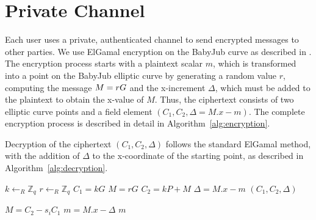 \documentclass[runningheads]{llncs}
\begin{document}
\section{Private Channel}
\label{private-channel}
Each user uses a private, authenticated channel to send encrypted messages to other parties. We use ElGamal encryption on the BabyJub curve as described in \cite{ElGamalEncryptionDecryption2020,jieWeijiekohElgamalbabyjub2023}. The encryption process starts with a plaintext scalar $m$, which is transformed into a point on the BabyJub elliptic curve by generating a random value $r$, computing the message $M=rG$ and the x-increment $\Delta$, which must be added to the plaintext to obtain the x-value of $M$. Thus, the ciphertext consists of two elliptic curve points and a field element $(C_1, C_2, \Delta=M.x - m)$. The complete encryption process is described in detail in Algorithm~\ref{alg:encryption}.

Decryption of the ciphertext $(C_1, C_2, \Delta)$ follows the standard ElGamal method, with the addition of $\Delta$ to the x-coordinate of the starting point, as described in Algorithm~\ref{alg:decryption}.

\begin{algorithm}
    \caption{$\texttt{Enc}_{P_i}$}
    \label{alg:encryption}
    
    
    $k \gets_R \mathbb{Z}_q$\;
    $r \gets_R \mathbb{Z}_q$\;
    $C_1 = kG$\;
    $M = rG$\;
    $C_2 = kP + M$\;
    $\Delta = M.x - m$\;
    \Return $(C_1, C_2, \Delta)$
\end{algorithm}

\begin{algorithm}
    \caption{$\texttt{Dec}_{s_i}$}
    \label{alg:decryption}
    
    
    $M = C_2 - s_i C_1$\;
    $m = M.x - \Delta$\;
    \Return $m$
\end{algorithm}
\end{document}
